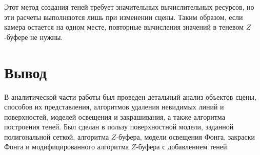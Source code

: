 Этот метод создания теней требует значительных вычислительных ресурсов, но эти расчеты выполняются лишь при изменении сцены. Таким образом, если камера остается на одном месте, повторные вычисления значений в теневом $Z$-буфере не нужны.

\section{Вывод}

В аналитической части работы был проведен детальный анализ объектов сцены, способов их представления, алгоритмов удаления невидимых линий и поверхностей, моделей освещения и закрашивания, а также алгоритма построения теней. Был сделан в пользу поверхностной модели, заданной полигональной сеткой, алгоритма $Z$-буфера, модели освещения Фонга, закраски Фонга и модифицированного алгоритма $Z$-буфера с добавлением теней.

\clearpage
